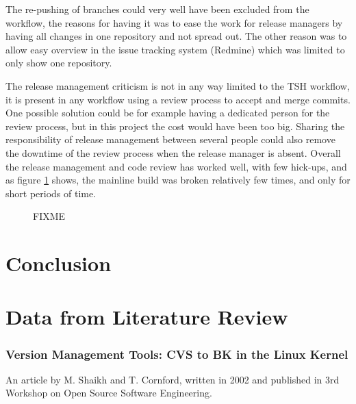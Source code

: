 \documentclass{llncs}
\begin{document}
The re-pushing of branches could very well have been excluded from the
workflow, the reasons for having it was to ease the work for release
managers by having all changes in one repository and not spread
out. The other reason was to allow easy overview in the issue tracking
system (Redmine) which was limited to only show one repository.

The release management criticism is not in any way limited to the TSH
workflow, it is present in any workflow using a review process to
accept and merge commits. One possible solution could be for example
having a dedicated person for the review process, but in this project
the cost would have been too big. Sharing the responsibility of
release management between several people could also remove the
downtime of the review process when the release manager is
absent. Overall the release management and code review has worked
well, with few hick-ups, and as figure \ref{fig:breakage} shows, the
mainline build was broken relatively few times, and only for short
periods of time.

\begin{figure}
 \begin{center}
  \caption{FIXME}
  \label{fig:breakage}
 \end{center}
\end{figure}

\section{Conclusion}

 


\appendix
\section{Data from Literature Review}
\subsubsection{Version Management Tools: CVS to BK in the Linux Kernel}

An article by M. Shaikh and T. Cornford, written in 2002 and published 
in 3rd Workshop on Open Source Software Engineering.
\end{document}
